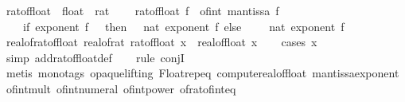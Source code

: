 \begin{isabellebody}
\isanewline
{}\isamarkupfalse%
\ rat{\isacharunderscore}{\kern0pt}of{\isacharunderscore}{\kern0pt}float\ {\isacharcolon}{\kern0pt}{\isacharcolon}{\kern0pt}\ {\isachardoublequoteopen}float\ {\isasymRightarrow}\ rat{\isachardoublequoteclose}\ \ \isanewline
\ \ {\isachardoublequoteopen}rat{\isacharunderscore}{\kern0pt}of{\isacharunderscore}{\kern0pt}float\ f\ {\isacharequal}{\kern0pt}\ of{\isacharunderscore}{\kern0pt}int\ {\isacharparenleft}{\kern0pt}mantissa\ f{\isacharparenright}{\kern0pt}\ {\isacharasterisk}{\kern0pt}\ \isanewline
\ \ \ \ {\isacharparenleft}{\kern0pt}if\ exponent\ f\ {\isasymge}\ {}\ then\ {}\ {\isacharcircum}{\kern0pt}\ {\isacharparenleft}{\kern0pt}nat\ {\isacharparenleft}{\kern0pt}exponent\ f{\isacharparenright}{\kern0pt}{\isacharparenright}{\kern0pt}\ else\ {}\ {\isacharslash}{\kern0pt}\ {}\ {\isacharcircum}{\kern0pt}\ {\isacharparenleft}{\kern0pt}nat\ {\isacharparenleft}{\kern0pt}{\isacharminus}{\kern0pt}exponent\ f{\isacharparenright}{\kern0pt}{\isacharparenright}{\kern0pt}{\isacharparenright}{\kern0pt}{\isachardoublequoteclose}\ \isanewline
\isanewline
{}\isamarkupfalse%
\ real{\isacharunderscore}{\kern0pt}of{\isacharunderscore}{\kern0pt}rat{\isacharunderscore}{\kern0pt}of{\isacharunderscore}{\kern0pt}float{\isacharcolon}{\kern0pt}\ {\isachardoublequoteopen}real{\isacharunderscore}{\kern0pt}of{\isacharunderscore}{\kern0pt}rat\ {\isacharparenleft}{\kern0pt}rat{\isacharunderscore}{\kern0pt}of{\isacharunderscore}{\kern0pt}float\ x{\isacharparenright}{\kern0pt}\ {\isacharequal}{\kern0pt}\ real{\isacharunderscore}{\kern0pt}of{\isacharunderscore}{\kern0pt}float\ x{\isachardoublequoteclose}\isanewline
%
\isadelimproof
\ \ %
\endisadelimproof
%
\isatagproof
{}\isamarkupfalse%
\ {\isacharparenleft}{\kern0pt}cases\ x{\isacharparenright}{\kern0pt}\isanewline
\ \ \isamarkupfalse%
\ {\isacharparenleft}{\kern0pt}simp\ add{\isacharcolon}{\kern0pt}rat{\isacharunderscore}{\kern0pt}of{\isacharunderscore}{\kern0pt}float{\isacharunderscore}{\kern0pt}def{\isacharparenright}{\kern0pt}\isanewline
\ \ \isamarkupfalse%
\ {\isacharparenleft}{\kern0pt}rule\ conjI{\isacharparenright}{\kern0pt}\isanewline
\ \ \ \isamarkupfalse%
\ {\isacharparenleft}{\kern0pt}metis\ {\isacharparenleft}{\kern0pt}mono{\isacharunderscore}{\kern0pt}tags{\isacharcomma}{\kern0pt}\ opaque{\isacharunderscore}{\kern0pt}lifting{\isacharparenright}{\kern0pt}\ Float{\isachardot}{\kern0pt}rep{\isacharunderscore}{\kern0pt}eq\ compute{\isacharunderscore}{\kern0pt}real{\isacharunderscore}{\kern0pt}of{\isacharunderscore}{\kern0pt}float\ mantissa{\isacharunderscore}{\kern0pt}exponent\ of{\isacharunderscore}{\kern0pt}int{\isacharunderscore}{\kern0pt}mult\ of{\isacharunderscore}{\kern0pt}int{\isacharunderscore}{\kern0pt}numeral\ of{\isacharunderscore}{\kern0pt}int{\isacharunderscore}{\kern0pt}power\ of{\isacharunderscore}{\kern0pt}rat{\isacharunderscore}{\kern0pt}of{\isacharunderscore}{\kern0pt}int{\isacharunderscore}{\kern0pt}eq{\isacharparenright}{\kern0pt}\isanewline

\end{isabellebody}
